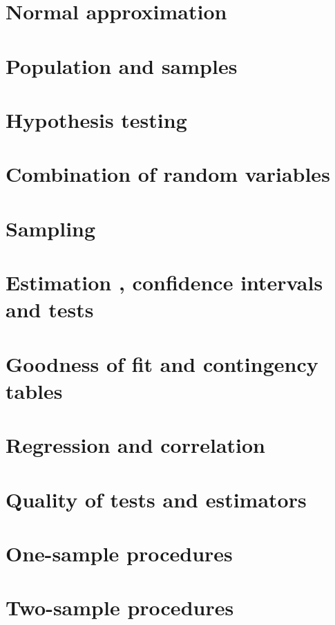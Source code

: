 \documentclass[a4paper]{article}
\begin{document}
\section{Normal approximation}

\section{Population and samples}

\section{Hypothesis testing}

\section{Combination of random variables}

\section{Sampling}

\section{Estimation , confidence intervals and tests}

\section{Goodness of fit and contingency tables}

\section{Regression and correlation}

\section{Quality of tests and estimators}

\section{One-sample procedures}

\section{Two-sample procedures}

\printindex
\end{document}
